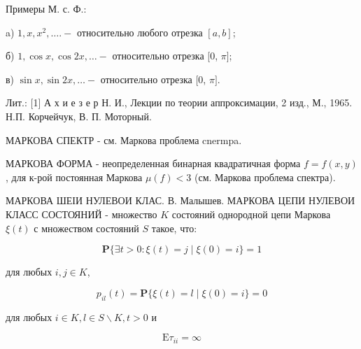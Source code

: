 \documentclass[10pt]{article}
\begin{document}
Примеры М. с. Ф.:



a) $1, x, x^{2}, \ldots .-$ относительно любого отрезка $[a, b]$;



б) $1, \cos x, \cos 2 x, \ldots-$ относительно отрезка [0, $\pi]$;



в) $\sin x, \sin 2 x, \ldots-$ относительно отрезка [0, $\pi]$.



Лит.: [1] А х и е з е р Н. И., Лекции по теории аппроксимации, 2 изд., М., 1965. Н.П. Корчейчук, В. П. Моторный.



МАРКОВА СПЕКТР - см. Маркова проблема cnermpa.



МАРКОВА ФОРМА - неопределенная бинарная квадратичная форма $f=f(x, y)$, для к-рой постоянная Маркова $\mu(f)<3$ (см. Маркова проблема спектра).



МАРКОВА ШЕІИ НУЛЕВОИ КЛАС. В. Малышев. МАРКОВА ЦЕПИ НУЛЕВОИ КЛАСС СОСТОЯНИЙ - множество $K$ состояний однородной цепи Маркова $\xi(t)$ с множеством состояний $S$ такое, что:



\[

\mathbf{P}\{\exists t>0: \xi(t)=j \mid \xi(0)=i\}=1

\]



для любых $i, j \in K$,



\[

p_{i l}(t)=\mathbf{P}\{\xi(t)=l \mid \xi(0)=i\}=0

\]



для любых $i \in K, l \in S \backslash K, t>0$ и



\[

\mathrm{E} \tau_{i i}=\infty

\]
\end{document}
